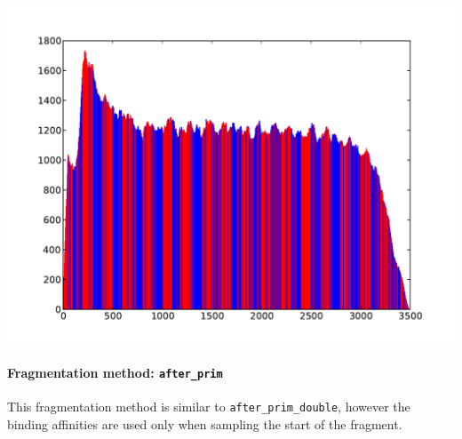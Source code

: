 \begin{center}
\includegraphics[scale=0.6,page=1]{../src/test/cov/cov_after_noprim_double.pdf}
\end{center}


\paragraph{{Fragmentation method: }\texttt{after\_prim}}

This fragmentation method is similar to \texttt{after\_prim\_double}, however the binding affinities are used only when sampling the start of the fragment.

